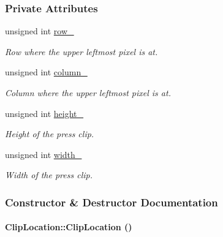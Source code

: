 \subsubsection*{Private Attributes}
\begin{CompactItemize}
\item 
\hypertarget{class_clip_location_1b2df7d88f1e70c6092704f0a5844d39}{
unsigned int \hyperlink{class_clip_location_1b2df7d88f1e70c6092704f0a5844d39}{row\_\-}}
\label{class_clip_location_1b2df7d88f1e70c6092704f0a5844d39}

\begin{CompactList}\small\item\em Row where the upper leftmost pixel is at. \item\end{CompactList}\item 
\hypertarget{class_clip_location_333e41e770e4cc18938b639a9072c138}{
unsigned int \hyperlink{class_clip_location_333e41e770e4cc18938b639a9072c138}{column\_\-}}
\label{class_clip_location_333e41e770e4cc18938b639a9072c138}

\begin{CompactList}\small\item\em Column where the upper leftmost pixel is at. \item\end{CompactList}\item 
\hypertarget{class_clip_location_bf304a78eade46f1b5c6cfcf42e15643}{
unsigned int \hyperlink{class_clip_location_bf304a78eade46f1b5c6cfcf42e15643}{height\_\-}}
\label{class_clip_location_bf304a78eade46f1b5c6cfcf42e15643}

\begin{CompactList}\small\item\em Height of the press clip. \item\end{CompactList}\item 
\hypertarget{class_clip_location_e39508c504ce7807d730e58c0270d2f9}{
unsigned int \hyperlink{class_clip_location_e39508c504ce7807d730e58c0270d2f9}{width\_\-}}
\label{class_clip_location_e39508c504ce7807d730e58c0270d2f9}

\begin{CompactList}\small\item\em Width of the press clip. \item\end{CompactList}\end{CompactItemize}


\subsubsection{Constructor \& Destructor Documentation}
\hypertarget{class_clip_location_fb51ec03e0a8f9b33f4d785550bc6b84}{
\paragraph[ClipLocation]{\setlength{\rightskip}{0pt plus 5cm}ClipLocation::ClipLocation ()}\hfill}
\label{class_clip_location_fb51ec03e0a8f9b33f4d785550bc6b84}


